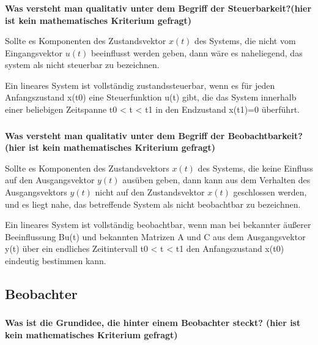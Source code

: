 \subsubsection{}
\textbf{Was versteht man qualitativ unter dem Begriff der Steuerbarkeit?(hier ist kein mathematisches Kriterium gefragt)}

Sollte es Komponenten des Zustandsvektor $x(t)$ des Systems, die nicht vom Eingangsvektor $u(t)$ beeinflusst werden geben, dann wäre es naheliegend, das system als nicht steuerbar zu bezeichnen.

Ein lineares System ist vollständig zustandssteuerbar, wenn es für jeden Anfangszustand x(t0) eine Steuerfunktion u(t) gibt, die das System innerhalb einer beliebigen Zeitspanne t0 < t < t1 in den Endzustand x(t1)=0 überführt.

\subsubsection{}
\textbf{Was versteht man qualitativ unter dem Begriff der Beobachtbarkeit?(hier ist kein mathematisches Kriterium gefragt)}

Sollte es Komponenten des Zustandsvektors $x(t)$ des Systems, die keine Einfluss auf den Ausgangsvektor $y(t)$ ausüben geben, dann kann aus dem Verhalten des Ausgangsvektors $y(t)$ nicht auf den Zustandsvektor $x(t)$ geschlossen werden, und es liegt nahe, das betreffende System als nicht beobachtbar zu bezeichnen.

Ein lineares System ist vollständig beobachtbar, wenn man bei bekannter äußerer Beeinflussung Bu(t) und bekannten Matrizen A und C aus dem Ausgangsvektor y(t) über ein endliches Zeitintervall t0 < t < t1 den Anfangszustand x(t0) eindeutig bestimmen kann.

\subsection{Beobachter}
\subsubsection{}
\textbf{Was ist die Grundidee, die hinter einem Beobachter steckt? (hier ist kein mathematisches Kriterium gefragt)}

